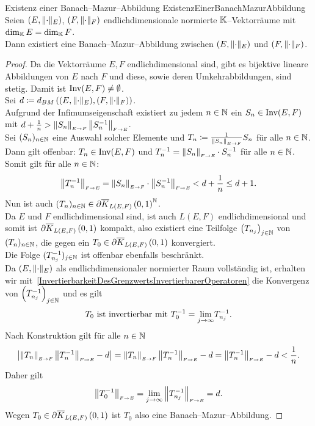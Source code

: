 \begin{satz}{Existenz einer Banach--Mazur--Abbildung}
            {ExistenzEinerBanachMazurAbbildung}
Seien $(E, \lVert\cdot\rVert_E)$, $(F, \lVert\cdot\rVert_F)$
endlichdimensionale normierte $\mathbb{K}$--Vektorräume mit $\dim_{\mathbb{K}} E = \dim_{\mathbb{K}} F$.\\
Dann existiert eine Banach--Mazur--Abbildung zwischen $(E, \lVert\cdot\rVert_E)$ und
$(F, \lVert\cdot\rVert_F)$.
\end{satz}
\begin{proof}
Da die Vektorräume $E, F$ endlichdimensional sind, gibt es bijektive lineare
Abbildungen von $E$ nach $F$ und diese, sowie deren Umkehrabbildungen, sind
stetig.
Damit ist $\mathop{\textrm{Inv}}\nolimits(E, F) \neq \emptyset$.\\
Sei $d\coloneqq d_{BM}\left( (E, \lVert\cdot\rVert_E), (F, \lVert\cdot\rVert_F) \right)$.\\
Aufgrund der Infimumseigenschaft existiert zu jedem $n \in \mathbb{N}$ ein
$S_n \in \mathop{\textrm{Inv}}\nolimits(E, F)$ mit 
$d + \frac 1 n > \left\|S_n\right\|_{\scriptscriptstyle{E \rightarrow F}} \left\|S_n^{-1}\right\|_{\scriptscriptstyle{F \rightarrow E}}$.\\
Sei $(S_{n})_{n \in \mathbb{N}}$ eine Auswahl solcher Elemente und
$T_n \coloneqq  \frac 1 {\left\|S_n\right\|_{\scriptscriptstyle{E \rightarrow F}}} S_n$ für alle $n \in \mathbb{N}$.\\
Dann gilt offenbar: 
$T_n \in \mathop{\textrm{Inv}}\nolimits(E, F)$ und $T_n^{-1} = \left\|S_n\right\|_{\scriptscriptstyle{F \rightarrow E}} \cdot S_n^{-1}$
für alle $n \in \mathbb{N}$.\\
Somit gilt für alle $n \in \mathbb{N}$:\[
\left\|T_n^{-1}\right\|_{\scriptscriptstyle{F \rightarrow E}}=\left\|S_n\right\|_{\scriptscriptstyle{E \rightarrow F}}\cdot\left\|S_n^{-1}\right\|_{\scriptscriptstyle{F \rightarrow E}}<d+\frac1n\le d+1
\text.\]
Nun ist auch $(T_{n})_{n \in \mathbb{N}} \in \partial \overline K_{L(E, F)}\left(0, 1\right) ^{\mathbb{N}}$.\\
Da $E$ und $F$ endlichdimensional sind, ist auch $L(E, F)$ endlichdimensional
und somit ist $\partial \overline K_{L(E,F)}\left(0, 1\right)$ kompakt,
also existiert eine
Teilfolge $\left(T_{n_j}\right)_{j \in \mathbb{N}}$ von $(T_{n})_{n \in \mathbb{N}}$, die gegen ein
$T_0 \in \partial \overline K_{L(E, F)}\left(0, 1\right)$ konvergiert.\\
Die Folge $(T_{n_j}^{-1})_{j\in \mathbb{N}}$ ist offenbar ebenfalls
beschränkt.\\
Da $(E, \lVert\cdot\rVert_E)$ als endlichdimensionaler normierter Raum vollständig
ist, erhalten wir mit~\ref{InvertierbarkeitDesGrenzwertsInvertierbarerOperatoren} die Konvergenz von
$\left(T_{n_j}^{-1} \right)_{j\in \mathbb{N}}$ und es gilt
\[T_0\text{ ist invertierbar mit }T_0^{-1}=\underset{j\to \infty}{\lim} T_{n_j}^{-1}\text. \]
Nach Konstruktion gilt für alle $n \in \mathbb{N}$\[ 
\left|\left\|T_n\right\|_{\scriptscriptstyle{E \rightarrow F}} \left\|T_n^{-1}\right\|_{\scriptscriptstyle{F \rightarrow E}} - d\right| 
=\left\|T_n\right\|_{\scriptscriptstyle{E \rightarrow F}}\left\|T_n^{-1}\right\|_{\scriptscriptstyle{F \rightarrow E}}-d=\left\|T_n^{-1}\right\|_{\scriptscriptstyle{F \rightarrow E}}-d<\frac 1n\text.\]
Daher gilt\[
\left\|T_0^{-1}\right\|_{\scriptscriptstyle{F \rightarrow E}} = \underset{j\to \infty}{\lim} \left\|T_{n_j}^{-1}\right\|_{\scriptscriptstyle{F \rightarrow E}} = d\text.\]
Wegen $T_0 \in \partial \overline K_{L(E, F)}\left(0, 1\right)$ ist $T_0$ also eine Banach--Mazur--Abbildung.
\end{proof}